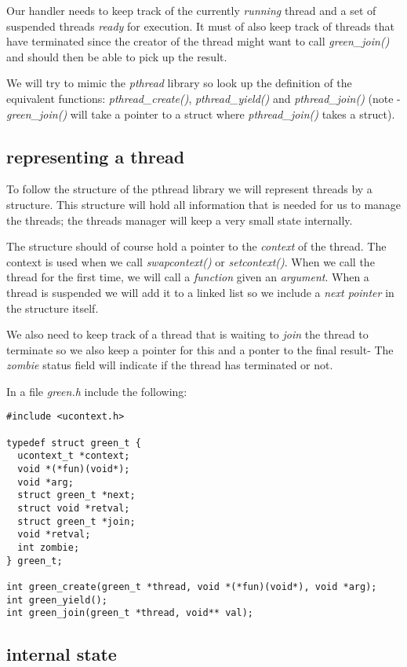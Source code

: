 \documentclass[a4paper,11pt]{article}
\begin{document}
Our handler needs to keep track of the currently {\em running} thread
and a set of suspended threads {\em ready} for execution. It must of
also keep track of threads that have terminated since the creator of
the thread might want to call {\em green\_join()} and should then
be able to pick up the result.

We will try to mimic the {\em pthread} library so look up the
definition of the equivalent functions: {\em pthread\_create()}, {\em
  pthread\_yield()} and {\em pthread\_join()} (note - {\em
  green\_join()} will take a pointer to a struct where {\em
  pthread\_join()} takes a struct).


\subsection*{representing a thread}

To follow the structure of the pthread library we will represent
threads by a structure. This structure will hold all information that
is needed for us to manage the threads; the threads manager will
keep a very small state internally.

The structure should of course hold a pointer to the {\em context} of
the thread. The context is used when we call {\em swapcontext()} or
{\em setcontext()}. When we call the thread for the first time, we
will call a {\em function} given an {\em argument}. When a thread is
suspended we will add it to a linked list so we include a {\em next
  pointer} in the structure itself.

We also need to keep track of a thread that is waiting to {\em join}
the thread to terminate so we also keep a pointer for this and a
ponter to the final result- The {\em zombie} status field will
indicate if the thread has terminated or not.

In a file {\em green.h} include the following:

\begin{lstlisting}
#include <ucontext.h>

typedef struct green_t {
  ucontext_t *context;
  void *(*fun)(void*);
  void *arg;
  struct green_t *next;
  struct void *retval;
  struct green_t *join;
  void *retval;
  int zombie;
} green_t;

int green_create(green_t *thread, void *(*fun)(void*), void *arg);
int green_yield();
int green_join(green_t *thread, void** val);
\end{lstlisting}

\subsection*{internal state}
\end{document}
